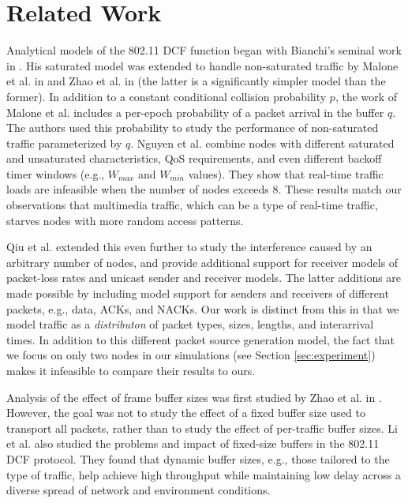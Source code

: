 \documentclass{llncs}
\begin{document}
\section{Related Work}
Analytical models of the 802.11 DCF function began with Bianchi's seminal work in \cite{bianchi1996performance}. His saturated model was extended to handle non-saturated traffic by Malone et al. in \cite{dcf-nonsaturated} and Zhao et al. in \cite{zhao2009simple} (the latter is a significantly simpler model than the former). In addition to a constant conditional collision probability $p$, the work of Malone et al. includes a per-epoch probability of a packet arrival in the buffer $q$. The authors used this probability to study the performance of non-saturated traffic parameterized by $q$. Nguyen et al. \cite{nguyen2012performance} combine nodes with different saturated and unsaturated characteristics, QoS requirements, and even different backoff timer windows (e.g., $W_{max}$ and $W_{min}$ values). They show that real-time traffic loads are infeasible when the number of nodes exceeds $8$. These results match our observations that multimedia traffic, which can be a type of real-time traffic, starves nodes with more random access patterns.

Qiu et al. \cite{qiu2007general} extended this even further to study the interference caused by an arbitrary number of nodes, and provide additional support for receiver models of packet-loss rates and unicast sender and receiver models. The latter additions are made possible by including model support for senders and receivers of different packets, e.g., data, ACKs, and NACKs. Our work is distinct from this in that we model traffic as a \emph{distributon} of packet types, sizes, lengths, and interarrival times. In addition to this different packet source generation model, the fact that we focus on only two nodes in our simulations (see Section \ref{sec:experiment}) makes it infeasible to compare their results to ours. 

Analysis of the effect of frame buffer sizes was first studied by Zhao et al. in \cite{zhao2011modeling}. However, the goal was not to study the effect of a fixed buffer size used to transport all packets, rather than to study the effect of per-traffic buffer sizes. Li et al. \cite{li2011buffer} also studied the problems and impact of fixed-size buffers in the 802.11 DCF protocol. They found that dynamic buffer sizes, e.g., those tailored to the type of traffic, help achieve high throughput while maintaining low delay across a diverse spread of network and environment conditions. 
\end{document}
